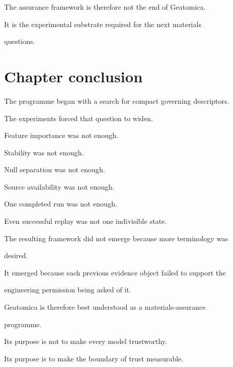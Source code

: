\documentclass[11pt,a4paper,oneside]{report}
\begin{document}
The assurance framework is therefore not the end of Geatomica.



It is the experimental substrate required for the next materials

questions.





\section{Chapter conclusion}



The programme began with a search for compact governing descriptors.



The experiments forced that question to widen.



Feature importance was not enough.



Stability was not enough.



Null separation was not enough.



Source availability was not enough.



One completed run was not enough.



Even successful replay was not one indivisible state.



The resulting framework did not emerge because more terminology was

desired.



It emerged because each previous evidence object failed to support the

engineering permission being asked of it.



Geatomica is therefore best understood as a materials-assurance

programme.



Its purpose is not to make every model trustworthy.



Its purpose is to make the boundary of trust measurable.
\end{document}
